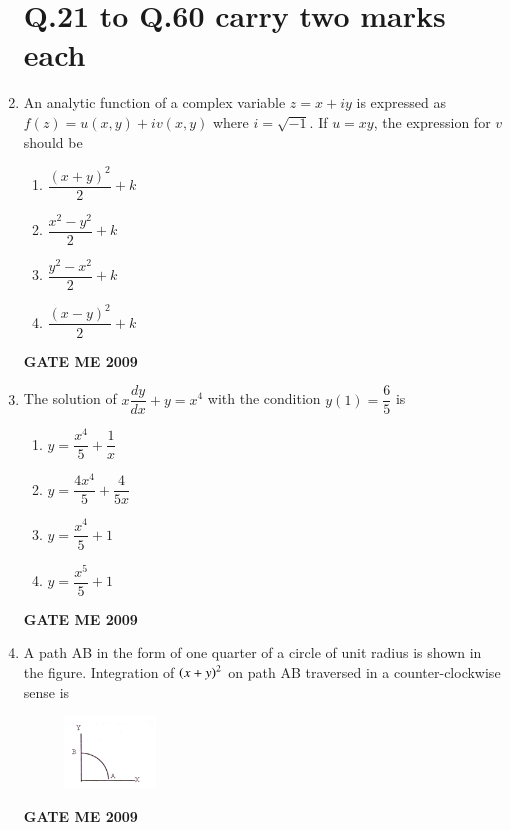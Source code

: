 \documentclass[journal]{IEEEtran}
\begin{document}
\begin{enumerate}[leftmargin=0pt]
\section*{\textbf{Q.21 to Q.60 carry two marks each}} 





\item An analytic function of a complex variable $z = x + iy$ is expressed as $f(z) = u(x,y) + iv(x,y)$ where $i = \sqrt{-1}$. If $u = xy$, the expression for $v$ should be
\begin{enumerate}
  \item $\dfrac{(x+y)^2}{2} + k$
  \item $\dfrac{x^2 - y^2}{2} + k$
  \item $\dfrac{y^2 - x^2}{2} + k$
  \item $\dfrac{(x-y)^2}{2} + k$
\end{enumerate}
\hfill{\textbf{GATE ME 2009}}



\item The solution of $x \dfrac{dy}{dx} + y = x^4$ with the condition $y(1) = \dfrac{6}{5}$ is
\begin{enumerate}
  \item $y = \dfrac{x^4}{5} + \dfrac{1}{x}$
  \item $y = \dfrac{4x^4}{5} + \dfrac{4}{5x}$
  \item $y = \dfrac{x^4}{5} + 1$
  \item $y = \dfrac{x^5}{5} + 1$
\end{enumerate}
\hfill{\textbf{GATE ME 2009}}




\item A path AB in the form of one quarter of a circle of unit radius is shown in the figure. Integration of $\left(x + y\right)^2$ on path AB traversed in a counter-clockwise sense is
\begin{figure}[h] 
  \centering
  \includegraphics[width=0.23\textwidth]{Figs/image (4).png}
  \caption{}
\end{figure}

\begin{enumerate}
\end{enumerate}
\hfill{\textbf{GATE ME 2009}}



\end{enumerate}
\end{document}
